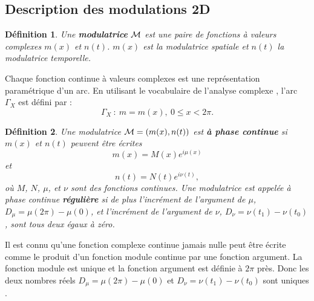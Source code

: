 \documentclass{book}
\newtheorem{defn}{D\'efinition}[chapter]
\begin{document}
\subsection{Description des modulations  2D}\label{sectiondescmodul}

\begin{defn}
Une  {\bf modulatrice} ${\cal M}$ est une paire de fonctions \`a valeurs
complexes $m(x)$ et $n(t)$. $m(x)$ est la modulatrice spatiale et
$n(t)$ la modulatrice temporelle.
\end{defn}
Chaque fonction continue \`a valeurs complexes est une
repr\'esentation param\'etrique 
d'un arc. En utilisant le vocabulaire de l'analyse complexe
 \cite{Henrici74}, l'arc $\Gamma_X$ est d\'efini par :
\begin{equation}
\Gamma_X\  :\  m=m(x), \ 0\leq x < 2\pi .
\end{equation}
\begin{defn}
Une modulatrice ${\cal M}=(m(x),n(t))$ est  {\bf \`a phase continue}
si $m(x)$ et $n(t)$ peuvent \^etre \'ecrites 
\begin{equation}
m(x)=M(x)e^{i\mu(x)}
\label{contx}
\end{equation}
et
\begin{equation}
n(t)=N(t)e^{i\nu(t)},
\label{contt}
\end{equation}
o\`u $M$, $N$, $\mu$, et $\nu$ sont des fonctions continues.
Une modulatrice est appel\'ee \`a phase continue 
{\bf r\'eguli\`ere}
si de plus l'incr\'ement de l'argument de $\mu$,
$D_\mu=\mu(2\pi)-\mu(0)$, et 
 l'incr\'ement de l'argument de $\nu$, $D_\nu=\nu(t_1)-\nu(t_0)$, sont
tous 
deux \'egaux \`a z\'ero.
\end{defn}


Il est connu qu'une fonction complexe continue jamais nulle peut
\^etre \'ecrite comme le produit d'un fonction module continue par une
fonction argument.
La fonction module est unique et la fonction argument est d\'efinie
\`a $2\pi$  
pr\`es.
Donc les deux nombres r\'eels $D_\mu=\mu(2\pi)-\mu(0)$ et
$D_\nu=\nu(t_1)-\nu(t_0)$  
sont uniques \cite{Henrici74}.
\end{document}
